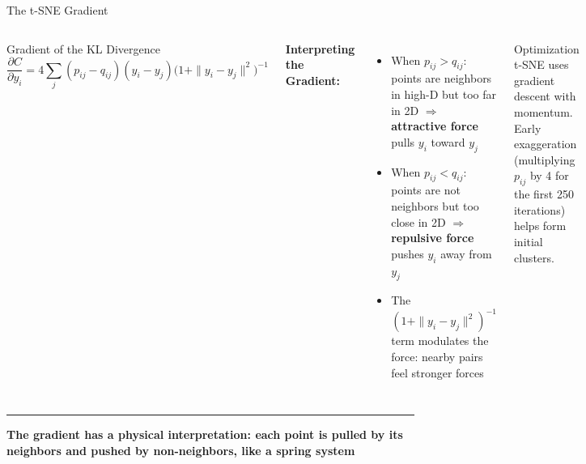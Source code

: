 \documentclass[8pt,aspectratio=169]{beamer}
\newcommand{\bottomnote}[1]{%
\vfill
\vspace{-2mm}
\textcolor{mllavender2}{\rule{\textwidth}{0.4pt}}
\vspace{1mm}
\footnotesize
\textbf{#1}
}
\newenvironment{compactlist}{%
  \begin{itemize}%
    \setlength{\itemsep}{2pt}%
    \setlength{\parskip}{0pt}%
    \setlength{\parsep}{0pt}%
}{%
  \end{itemize}%
}
\newcommand{\highlight}[1]{\textcolor{mlorange}{\textbf{#1}}}
\begin{document}
\begin{frame}[t]{The t-SNE Gradient}
\begin{columns}[T]
\small

\vspace{1mm}
\begin{block}{Gradient of the KL Divergence}
\[
\frac{\partial C}{\partial y_i} = 4\sum_j (p_{ij} - q_{ij})(y_i - y_j)\bigl(1 + \|y_i - y_j\|^2\bigr)^{-1}
\]
\end{block}

\vspace{1mm}
\textbf{Interpreting the Gradient:}
\begin{compactlist}
\item When $p_{ij} > q_{ij}$: points are neighbors in high-D but too far in 2D $\Rightarrow$ \highlight{attractive force} pulls $y_i$ toward $y_j$
\item When $p_{ij} < q_{ij}$: points are not neighbors but too close in 2D $\Rightarrow$ \highlight{repulsive force} pushes $y_i$ away from $y_j$
\item The $(1 + \|y_i - y_j\|^2)^{-1}$ term modulates the force: nearby pairs feel stronger forces
\end{compactlist}

\begin{block}{Optimization}
\scriptsize t-SNE uses gradient descent with momentum. Early exaggeration (multiplying $p_{ij}$ by 4 for the first 250 iterations) helps form initial clusters.
\end{block}
\end{columns}

\bottomnote{The gradient has a physical interpretation: each point is pulled by its neighbors and pushed by non-neighbors, like a spring system}
\end{frame}

\end{document}
